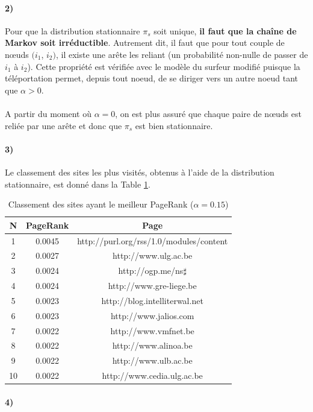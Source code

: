 \documentclass[a4paper,titlepage]{report}
\begin{document}
\paragraph{2)}
Pour que la distribution stationnaire $\pi_s$ soit unique, \textbf{il faut que la chaîne de Markov soit irréductible}. Autrement dit, il faut que pour tout couple de nœuds $(i_1$, $i_2)$, il existe une arête les reliant (un probabilité non-nulle de passer de $i_1$ à $i_2$). Cette propriété est vérifiée avec le modèle du surfeur modifié puisque la téléportation permet, depuis tout noeud, de se diriger vers un autre noeud tant que $\alpha > 0$. 
\paragraph{}
A partir du moment où $\alpha = 0$, on est plus assuré que chaque paire de nœuds est reliée par une arête et donc que $\pi_s$ est bien stationnaire.
\paragraph{3)} 
Le classement des sites les plus visités, obtenus à l'aide de la distribution stationnaire, est donné dans la Table \ref{tab:best_page_rank}.
\begin{table}[h]
	\center
	\begin{tabular}{|c|c|c|}
		\hline
		N\degre & PageRank & Page \\
		\hline
		1 & 0.0045 & http://purl.org/rss/1.0/modules/content \\
		2 & 0.0027 & http://www.ulg.ac.be \\
		3 & 0.0024 & http://ogp.me/ns$\sharp$ \\
		4 & 0.0024 & http://www.gre-liege.be  \\
		5 & 0.0023 & http://blog.intelliterwal.net  \\
		6 & 0.0023 & http://www.jalios.com  \\
		7 & 0.0022 & http://www.vmfnet.be  \\
		8 & 0.0022 & http://www.alinoa.be  \\
		9 & 0.0022 & http://www.ulb.ac.be  \\
		10 & 0.0022 & http://www.cedia.ulg.ac.be  \\
		\hline
	\end{tabular}
	\caption{Classement des sites ayant le meilleur PageRank ($\alpha = 0.15$)}
	\label{tab:best_page_rank}
\end{table}
\paragraph{4)}
\end{document}
